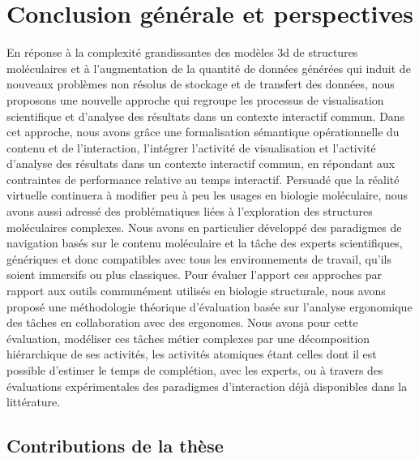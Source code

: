 


\chapter*{Conclusion générale et perspectives}
\mtcaddchapter

\mtcaddpart


En réponse à la complexité grandissantes des modèles 3d de structures moléculaires et à l'augmentation de la quantité de données générées qui induit de nouveaux problèmes non résolus de stockage et de transfert des données, nous proposons une nouvelle approche qui  
regroupe les processus de visualisation scientifique et d'analyse des résultats dans un contexte interactif commun. Dans cet approche, nous avons grâce une formalisation sémantique opérationnelle du contenu et de l'interaction, l'intégrer l'activité de visualisation et l'activité d'analyse des résultats dans un contexte interactif commun, en répondant aux contraintes de performance relative au temps interactif. Persuadé que la réalité virtuelle continuera à modifier peu à peu les usages en biologie moléculaire, nous avons aussi adressé des problématiques liées à l'exploration des structures moléculaires complexes. Nous avons en particulier développé des paradigmes de navigation basés sur le contenu moléculaire et la tâche des experts scientifiques, génériques et donc compatibles avec tous les environnements de travail, qu'ils soient immersifs ou plus classiques. Pour évaluer l'apport ces approches par rapport aux outils communément utilisés en biologie structurale, nous avons proposé une méthodologie théorique d'évaluation basée sur l'analyse ergonomique des tâches en collaboration avec des ergonomes. Nous avons pour cette évaluation, modéliser ces tâches métier complexes par une décomposition hiérarchique de ses activités, les activités atomiques étant celles dont il est possible d'estimer le temps de complétion, avec les experts, ou à travers des évaluations expérimentales des paradigmes d'interaction déjà disponibles dans la littérature.

\section*{Contributions de la thèse}

